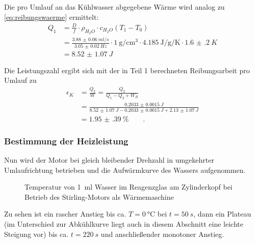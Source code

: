 Die pro Umlauf an das Kühlwasser abgegebene Wärme wird analog zu \cref{eq:reibungswaerme} ermittelt:
\begin{align}
	Q_1&=\frac{D}{f}\cdot \rho_{H_2O}\cdot c_{H_2O}(T_1-T_0) \\
	&=\frac{\SI{3.88(6)}{ml/s}}{\SI{3.05(2)}{Hz}}\cdot \SI{1}{\g\per\cubic\cm}\cdot \SI{4.185}{\joule\per\gram\per\kelvin}\cdot \SI{1.6(2)}{K} \\
	&=\SI{8.52(107)}{J}
\label{eq:q1}
\end{align}

Die Leistungszahl ergibt sich mit der in Teil 1 berechneten Reibungsarbeit pro Umlauf zu
\begin{align}
	\epsilon_K&=\frac{Q_2}{W}=\frac{Q_2}{Q_1-Q_2+W_R}\\
	&=\frac{\SI{0.2033(15)}{J}}{\SI{8.52(107)}{J}-\SI{0.2033(15)}{J}+\SI{2.13(107)}{J}}\\
	&=\SI{1.95(39)}{\percent}\qquad.
\label{eq:leistungkalt}
\end{align}

\subsubsection{Bestimmung der Heizleistung}
Nun wird der Motor bei gleich bleibender Drehzahl in umgekehrter Umlaufrichtung betrieben und die Aufwärmkurve des Wassers aufgenommen.

\begin{figure}[h!]
\centering
{}
\caption{Temperatur von \SI{1}{ml} Wasser im Reagenzglas am Zylinderkopf bei Betrieb des Stirling-Motors als Wärmemaschine}
\label{fig:waermepumpe}
\end{figure}
Zu sehen ist ein rascher Anstieg bis ca. $T=\SI{0}{\degreeCelsius}$ bei $t=\SI{50}{s}$, dann ein Plateau (im Unterschied zur Abkühlkurve liegt auch in diesem Abschnitt eine leichte Steigung vor) bis ca. $t=\SI{220}{s}$ und anschließender monotoner Anstieg.

